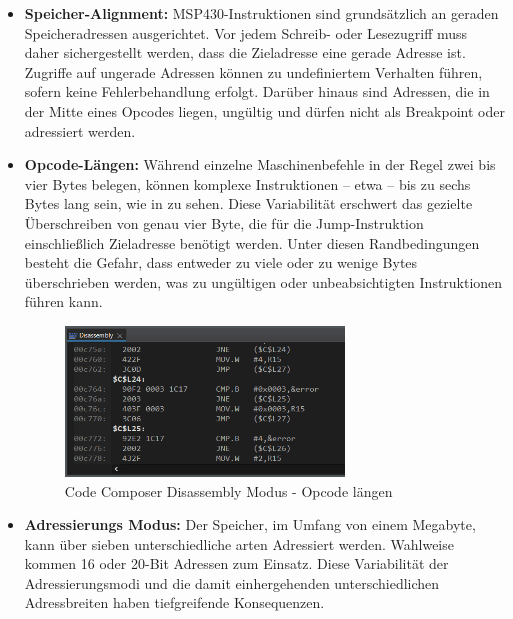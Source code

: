 \begin{itemize}
	\item \textbf{Speicher-Alignment:} MSP430-Instruktionen sind grunds\"atzlich an geraden Speicheradressen ausgerichtet. Vor jedem Schreib- oder Lesezugriff muss daher sichergestellt werden, dass die Zieladresse eine gerade Adresse ist. Zugriffe auf ungerade Adressen k\"onnen zu undefiniertem Verhalten f\"uhren, sofern keine Fehlerbehandlung erfolgt. Dar\"uber hinaus sind Adressen, die in der Mitte eines Opcodes liegen, ung\"ultig und d\"urfen nicht als Breakpoint oder adressiert werden.
	
	\item \textbf{Opcode-L\"angen:} W\"ahrend einzelne Maschinenbefehle in der Regel zwei bis vier Bytes belegen, k\"onnen komplexe Instruktionen – etwa  – bis zu sechs Bytes lang sein, wie in  zu sehen.  Diese Variabilit\"at erschwert das gezielte \"Uberschreiben von genau vier Byte, die f\"ur die Jump-Instruktion einschlie{\ss}lich Zieladresse ben\"otigt werden. Unter diesen Randbedingungen besteht die Gefahr, dass entweder zu viele oder zu wenige Bytes \"uberschrieben werden, was zu ung\"ultigen oder unbeabsichtigten Instruktionen f\"uhren kann.
	
	\begin{figure}[h!]
		\centering
		\includegraphics[width=0.7\textwidth]{../Bilder/OpcodeLaengen.png}
		\caption{Code Composer Disassembly Modus - Opcode l\"angen}
		\label{fig:DisassemblyOpcodeLaengen}
	\end{figure}
	
	\newpage
	\item \textbf{Adressierungs Modus:} Der Speicher, im Umfang von einem Megabyte, kann \"uber sieben unterschiedliche arten Adressiert werden. Wahlweise kommen 16 oder 20-Bit Adressen zum Einsatz. Diese Variabilit\"at der Adressierungsmodi und die damit einhergehenden unterschiedlichen Adressbreiten haben tiefgreifende Konsequenzen.
\end{itemize}

